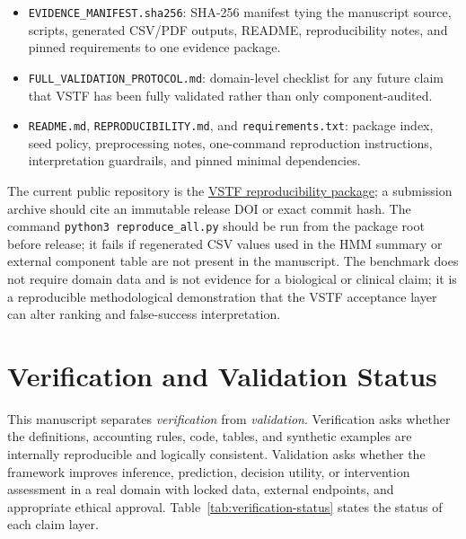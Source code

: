 \documentclass[11pt,a4paper]{article}
\newcommand{\1}{\mathbf{1}}
\begin{document}
\begin{itemize}
  \item \texttt{EVIDENCE\_MANIFEST.sha256}: SHA-256 manifest tying the manuscript source, scripts, generated CSV/PDF outputs, README, reproducibility notes, and pinned requirements to one evidence package.
  \item \texttt{FULL\_VALIDATION\_PROTOCOL.md}: domain-level checklist for any future claim that VSTF has been fully validated rather than only component-audited.
  \item \texttt{README.md}, \texttt{REPRODUCIBILITY.md}, and \texttt{requirements.txt}: package index, seed policy, preprocessing notes, one-command reproduction instructions, interpretation guardrails, and pinned minimal dependencies.
\end{itemize}
The current public repository is the \href{https://github.com/MartinPetrasek123/R_Universe_Evidence_Audited/tree/main/vstf}{VSTF reproducibility package}; a submission archive should cite an immutable release DOI or exact commit hash. The command \texttt{python3 reproduce\_all.py} should be run from the package root before release; it fails if regenerated CSV values used in the HMM summary or external component table are not present in the manuscript. The benchmark does not require domain data and is not evidence for a biological or clinical claim; it is a reproducible methodological demonstration that the VSTF acceptance layer can alter ranking and false-success interpretation.

\section{Verification and Validation Status}

This manuscript separates \emph{verification} from \emph{validation}. Verification asks whether the definitions, accounting rules, code, tables, and synthetic examples are internally reproducible and logically consistent. Validation asks whether the framework improves inference, prediction, decision utility, or intervention assessment in a real domain with locked data, external endpoints, and appropriate ethical approval. Table~\ref{tab:verification-status} states the status of each claim layer.
\end{document}

